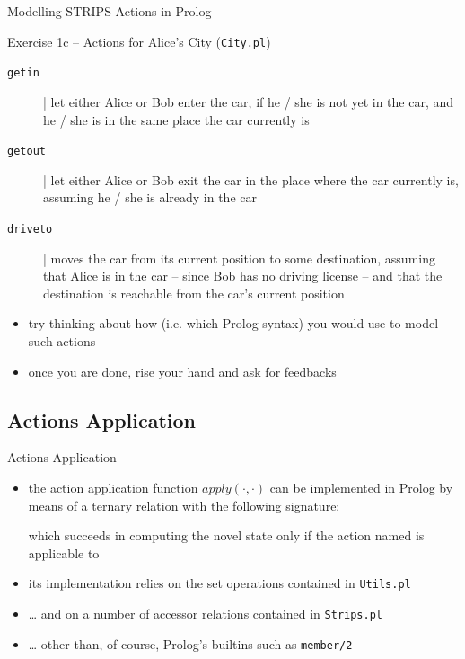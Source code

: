 \documentclass[presentation]{beamer}\mode<presentation>{\usetheme{AMSBolognaFC}}
\begin{document}
\begin{frame}[allowframebreaks]{Modelling STRIPS Actions in Prolog}
\begin{block}{Exercise 1c -- Actions for Alice's City (\texttt{City.pl})}
   	\begin{description}
   	    \item[\texttt{getin}] | let either Alice or Bob enter the car, if he / she is not yet in the car, and he / she is in the same place the car currently is
   	    \item[\texttt{getout}] | let either Alice or Bob exit the car in the place where the car currently is, assuming he / she is already in the car
   	    \item[\texttt{driveto}] | moves the car from its current position to some destination, assuming that Alice is in the car -- since Bob has no driving license -- and that the destination is reachable from the car's current position
   	\end{description}
\end{block}

\begin{itemize}
	\item try thinking about \alert{how} (i.e. which Prolog syntax) you would use to model such actions

	\item once you are done, rise your hand and ask for feedbacks
\end{itemize}
\end{frame}


\subsection{Actions Application}

\begin{frame}[c]{Actions Application}

	\begin{itemize}
		\item the action application function $apply(\cdot, \cdot)$ can be implemented in Prolog by means of a ternary relation with the following signature:
		\begin{center}
		\end{center}
		which succeeds in computing the novel state  only if the action named  is applicable to 

		\vfill

		\item its implementation relies on the set operations contained in \texttt{Utils.pl}

		\vfill

		\item \ldots{} and on a number of accessor relations contained in \texttt{Strips.pl}

		\vfill

		\item \ldots{} other than, of course, Prolog's builtins such as \texttt{member/2}
	\end{itemize}
\end{frame}
\end{document}
